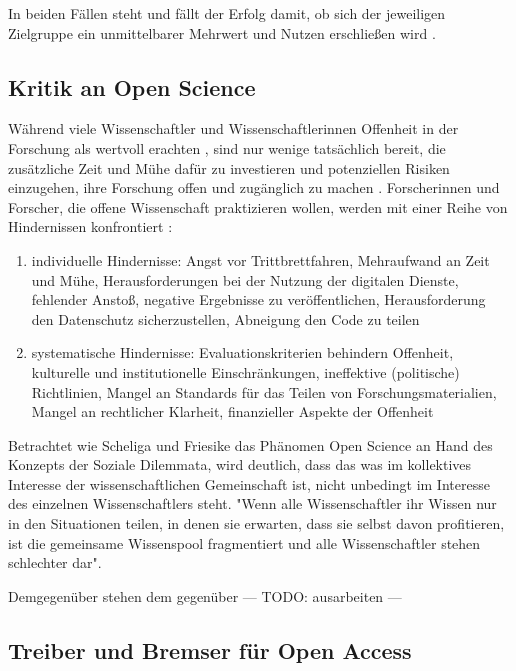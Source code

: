In beiden Fällen steht und fällt der Erfolg damit, ob sich der jeweiligen Zielgruppe ein unmittelbarer Mehrwert und Nutzen erschließen wird \cite{schulze_2013_open}.

\subsection{Kritik an Open Science}

Während viele Wissenschaftler und Wissenschaftlerinnen Offenheit in der Forschung als wertvoll erachten \cite{suchen}, sind nur wenige tatsächlich bereit, die zusätzliche Zeit und Mühe dafür zu investieren und potenziellen Risiken einzugehen, ihre Forschung offen und zugänglich zu machen \cite{Scheliga_2014} \cite{Procter_2010}. Forscherinnen und Forscher, die offene Wissenschaft praktizieren wollen, werden mit einer Reihe von Hindernissen konfrontiert \cite{Scheliga_2014}: 
\begin{enumerate}
\item individuelle Hindernisse: Angst vor Trittbrettfahren, Mehraufwand an Zeit und Mühe, Herausforderungen bei der Nutzung der digitalen Dienste, fehlender Anstoß, negative Ergebnisse zu veröffentlichen, Herausforderung den Datenschutz sicherzustellen, Abneigung den Code zu teilen
\item systematische Hindernisse: Evaluationskriterien behindern Offenheit, kulturelle und institutionelle Einschränkungen, ineffektive (politische) Richtlinien, Mangel an Standards für das Teilen von Forschungsmaterialien, Mangel an rechtlicher Klarheit, finanzieller Aspekte der Offenheit
\end{enumerate}

Betrachtet wie Scheliga und Friesike das Phänomen Open Science an Hand des Konzepts der Soziale Dilemmata, wird deutlich, dass das was im kollektives Interesse der wissenschaftlichen Gemeinschaft ist, nicht unbedingt im Interesse des einzelnen Wissenschaftlers steht. "Wenn alle Wissenschaftler ihr Wissen nur in den Situationen teilen, in denen sie erwarten, dass sie selbst davon profitieren, ist die gemeinsame Wissenspool fragmentiert und alle Wissenschaftler stehen schlechter dar"\cite{Scheliga_2014}. 

Demgegenüber stehen dem gegenüber  --- TODO: ausarbeiten ---

\subsection{Treiber und Bremser für Open Access} 


